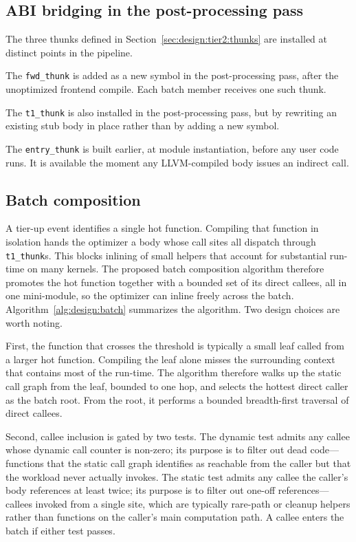 \subsection{ABI bridging in the post-processing pass}
\label{sec:design:tier2:bridging}

The three thunks defined in Section~\ref{sec:design:tier2:thunks} are installed at distinct points in the pipeline.

The \texttt{fwd\_thunk} is added as a new symbol in the post-processing pass, after the unoptimized frontend compile. Each batch member receives one such thunk.

The \texttt{t1\_thunk} is also installed in the post-processing pass, but by rewriting an existing stub body in place rather than by adding a new symbol.

The \texttt{entry\_thunk} is built earlier, at module instantiation, before any user code runs. It is available the moment any LLVM-compiled body issues an indirect call.

\subsection{Batch composition}
\label{sec:design:tier2:batch}

A tier-up event identifies a single hot function. Compiling that function in isolation hands the optimizer a body whose call sites all dispatch through \texttt{t1\_thunk}s. This blocks inlining of small helpers that account for substantial run-time on many kernels. The proposed batch composition algorithm therefore promotes the hot function together with a bounded set of its direct callees, all in one mini-module, so the optimizer can inline freely across the batch. Algorithm~\ref{alg:design:batch} summarizes the algorithm. Two design choices are worth noting.

First, the function that crosses the threshold is typically a small leaf called from a larger hot function. Compiling the leaf alone misses the surrounding context that contains most of the run-time. The algorithm therefore walks up the static call graph from the leaf, bounded to one hop, and selects the hottest direct caller as the batch root. From the root, it performs a bounded breadth-first traversal of direct callees.

Second, callee inclusion is gated by two tests. The dynamic test admits any callee whose dynamic call counter is non-zero; its purpose is to filter out dead code---functions that the static call graph identifies as reachable from the caller but that the workload never actually invokes. The static test admits any callee the caller's body references at least twice; its purpose is to filter out one-off references---callees invoked from a single site, which are typically rare-path or cleanup helpers rather than functions on the caller's main computation path. A callee enters the batch if either test passes.

